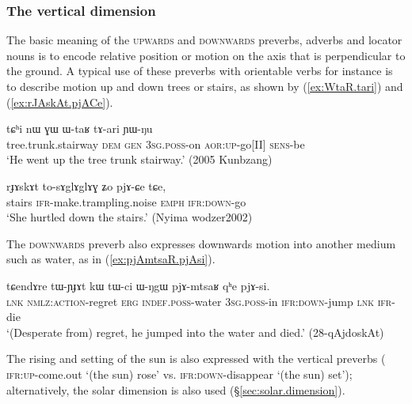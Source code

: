  
\subsubsection{The vertical dimension}  \label{sec:vertical.dimension}
The basic meaning of the \textsc{upwards}  and \textsc{downwards} preverbs, adverbs and locator nouns is to encode relative position or motion on the axis that is perpendicular to the ground. A typical use of these preverbs with orientable verbs for instance is to describe motion up and down trees or stairs, as shown by (\ref{ex:WtaR.tari}) and (\ref{ex:rJAskAt.pjACe}).

\begin{exe}
\ex \label{ex:WtaR.tari}
 \gll tɕʰi nɯ ɣɯ ɯ-taʁ tɤ-ari ɲɯ-ŋu \\
 tree.trunk.stairway \textsc{dem} \textsc{gen} \textsc{3sg}.\textsc{poss}-on \textsc{aor}:\textsc{up}-go[II] \textsc{sens}-be \\
\glt `He went up the tree trunk stairway.' (2005 Kunbzang)
\end{exe}

\begin{exe}
\ex \label{ex:rJAskAt.pjACe}
 \gll  rɟɤskɤt to-sɤglɤglɤɣ ʑo pjɤ-ɕe tɕe,   \\
stairs \textsc{ifr}-make.trampling.noise \textsc{emph} \textsc{ifr}:\textsc{down}-go \\
\glt `She hurtled down the stairs.' (Nyima wodzer2002)
\end{exe}

The \textsc{downwards} preverb also expresses downwards motion into another medium such as water, as in (\ref{ex:pjAmtsaR.pjAsi}).

\begin{exe}
\ex \label{ex:pjAmtsaR.pjAsi}
 \gll tɕendɤre tɯ-ɲɟɤt kɯ tɯ-ci ɯ-ŋgɯ pjɤ-mtsaʁ qʰe pjɤ-si. \\
 \textsc{lnk} \textsc{nmlz}:\textsc{action}-regret \textsc{erg} \textsc{indef}.\textsc{poss}-water \textsc{3sg}.\textsc{poss}-in \textsc{ifr}:\textsc{down}-jump \textsc{lnk} \textsc{ifr}-die \\
 \glt `(Desperate from) regret, he jumped into the water and died.' (28-qAjdoskAt)
\end{exe}

The rising and setting of the sun is also expressed with the vertical preverbs ( \textsc{ifr}:\textsc{up}-come.out `(the sun) rose' vs.  \textsc{ifr}:\textsc{down}-disappear `(the sun) set'); alternatively, the solar dimension is also used (§\ref{sec:solar.dimension}).

